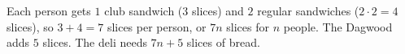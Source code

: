 Each person gets $1$ club sandwich ($3$ slices) and $2$ regular sandwiches ($2\cdot2=4$ slices), so $3+4=7$ slices per person, or $7n$ slices for $n$ people. The Dagwood adds $5$ slices. The deli needs $\boxed{7n+5}$ slices of bread.

